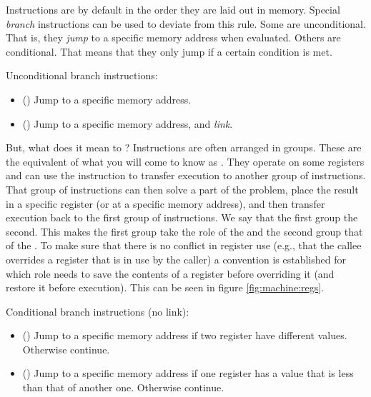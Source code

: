 
Instructions are by default  in the order they are laid out in memory. Special \textsl{branch} instructions can be used to deviate from this rule. Some are unconditional. That is, they \textsl{jump} to a specific memory address when evaluated. Others are conditional. That means that they only jump if a certain condition is met.

Unconditional branch instructions:
\begin{itemize}
  \item {} () Jump to a specific memory address.
  \item {} () Jump to a specific memory address, and \textsl{link}.
\end{itemize}

But, what does it mean to ? Instructions are often arranged in groups. These are the equivalent of what you will come to know as . They operate on some registers and can use the  instruction to transfer execution to another group of instructions. That group of instructions can then solve a part of the problem, place the result in a specific register (or at a specific memory address), and then transfer execution back to the first group of instructions. We say that the first group  the second. This makes the first group take the role of the  and the second group that of the . To make sure that there is no conflict in register use (e.g., that the callee overrides a register that is in use by the caller) a convention is established for which role needs to save the contents of a register before overriding it (and restore it before  execution). This can be seen in figure \ref{fig:machine:regs}.

Conditional branch instructions (no link):
\begin{itemize}
  \item {} () Jump to a specific memory address if two register have different values. Otherwise continue.
  \item {} () Jump to a specific memory address if one register has a value that is less than that of another one. Otherwise continue.
\end{itemize}

